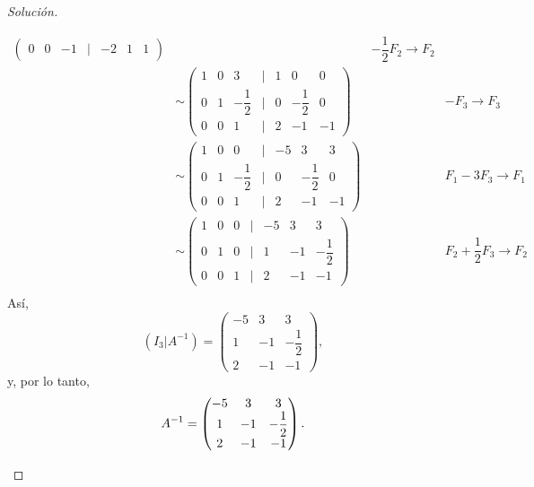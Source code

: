 \documentclass[a4,11pt]{aleph-notas}
\begin{document}
\begin{proof}[Solución]
\begin{enumerate}
\begin{align*}
\begin{pmatrix}
                0 & 0 & -1 & | & -2 & 1 & 1 
            \end{pmatrix} && -\dfrac{1}{2} F_2 \rightarrow F_2 \\
            & \sim \begin{pmatrix}
                1 & 0 & 3 & | & 1 & 0 & 0 \\
                0 & 1 & -\dfrac{1}{2} & | & 0 & -\dfrac{1}{2} & 0 \\
                0 & 0 & 1 & | & 2 & -1 & -1 
            \end{pmatrix} && - F_3 \rightarrow F_3 \\
            & \sim \begin{pmatrix}
                1 & 0 & 0 & | & -5 & 3 & 3 \\
                0 & 1 & -\dfrac{1}{2} & | & 0 & -\dfrac{1}{2} & 0 \\
                0 & 0 & 1 & | & 2 & -1 & -1 
            \end{pmatrix} && F_1 - 3 F_3 \rightarrow F_1 \\
            & \sim \begin{pmatrix}
                1 & 0 & 0 & | & -5 & 3 & 3 \\
                0 & 1 & 0 & | & 1 & -1 & -\dfrac{1}{2} \\
                0 & 0 & 1 & | & 2 & -1 & -1 
            \end{pmatrix} && F_2 + \dfrac{1}{2} F_3 \rightarrow F_2 \\
        \end{align*}
        Así, 
        \[
            (I_3|A^{-1}) = \begin{pmatrix}
                -5 & 3 & 3 \\
                 1 & -1 & -\dfrac{1}{2} \\
                 2 & -1 & -1 
            \end{pmatrix},
        \]
        y, por lo tanto, 
        \[
            A^{-1} = \begin{pmatrix}
                -5 & 3 & 3 \\
                 1 & -1 & -\dfrac{1}{2} \\
                 2 & -1 & -1 
            \end{pmatrix}. \qedhere
        \]
    \end{enumerate}
\end{proof}
\end{document}
